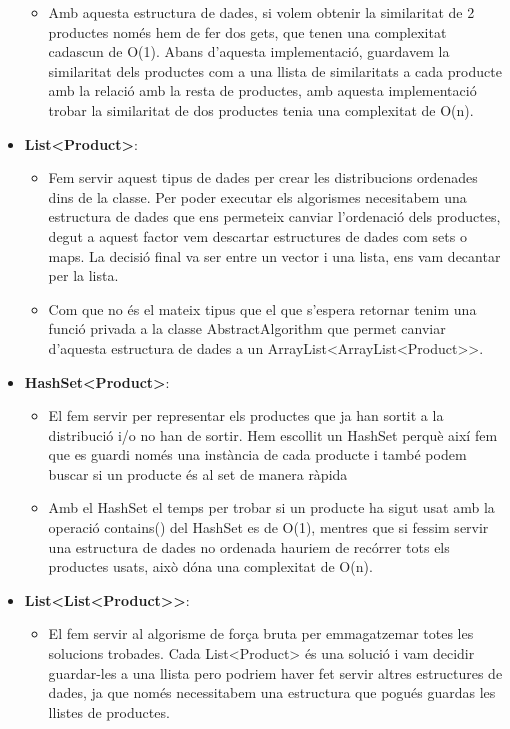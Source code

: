 \documentclass[a4paper, t]{article}
\begin{document}
\begin{itemize}
\begin{itemize}
        \item Amb aquesta estructura de dades, si volem obtenir la similaritat de 2 productes només hem de fer dos gets, que tenen una complexitat cadascun de O(1). Abans d’aquesta implementació, guardavem la similaritat dels productes com a una llista de similaritats a cada producte amb la relació amb la resta de productes, amb aquesta implementació trobar la similaritat de dos productes tenia una complexitat de O(n).
        
    \end{itemize}
    
     \item \textbf{List\textless Product\textgreater}: 
    \begin{itemize}
        \item Fem servir aquest tipus de dades per crear les distribucions ordenades dins de la classe. Per poder executar els algorismes necesitabem una estructura de dades que ens permeteix canviar l’ordenació dels productes, degut a aquest factor vem descartar estructures de dades com sets o maps. La decisió final va ser entre un vector i una lista, ens vam decantar per la lista.

        \item Com que no és el mateix tipus que el que s’espera retornar tenim una funció privada a la classe AbstractAlgorithm que permet canviar d’aquesta estructura de dades a un ArrayList<ArrayList<Product>>.
        
    \end{itemize}

     \item \textbf{HashSet\textless Product\textgreater}: 
    \begin{itemize}
        \item El fem servir per representar els productes que ja han sortit a la distribució i/o no han de sortir. Hem escollit un HashSet perquè així fem que es guardi només una instància de cada producte i també podem buscar si un producte és al set de manera ràpida

        \item Amb el HashSet el temps per trobar si un producte ha sigut usat amb la operació contains() del HashSet es de O(1), mentres que si fessim servir una estructura de dades no ordenada hauriem de recórrer tots els productes usats, això dóna una complexitat de O(n).
        
    \end{itemize}

    \item \textbf{List\textless List\textless Product\textgreater \textgreater}: 
    \begin{itemize}
        \item El fem servir al algorisme de força bruta per emmagatzemar totes les solucions trobades. Cada List<Product> és una solució i vam decidir guardar-les a una llista pero podriem haver fet servir altres estructures de dades, ja que només necessitabem una estructura que pogués guardas les llistes de productes.

    \end{itemize}
\end{itemize}
\newpage
\end{document}
